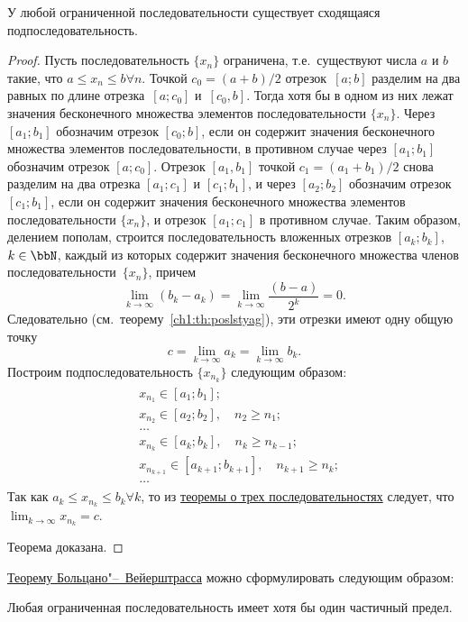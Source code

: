 \begin{thm}\label{ch1:th:TBV}
 У любой ограниченной последовательности существует сходящаяся подпоследовательность.
\end{thm}
\begin{proof}
Пусть последовательность $\{x_n\}$ ограничена, т.е.~существуют числа $a$ и $b$ такие, что $a \le x_n \le b$\quad$\forall n$. Точкой
$c_0 = (a + b)/2$ отрезок~$[a; b]$ разделим на два равных по длине отрезка~$[a; c_0]$ и~$[c_0,b]$. Тогда хотя бы в одном из них лежат значения бесконечного множества элементов последовательности $\{x_n\}$. Через $[a_1;b_1]$ обозначим отрезок $[c_0;b]$, если он содержит значения бесконечного множества элементов последовательности, в противном случае через $[a_1; b_1]$ обозначим отрезок $[a; c_0]$. Отрезок $[a_1, b_1]$ точкой $c_1 = (a_1 + b_1)/2$ снова разделим на два отрезка $[a_1;c_1]$ и $[c_1;b_1]$, и через $[a_2;b_2]$ обозначим отрезок $[c_1;b_1]$, если он содержит значения бесконечного множества элементов последовательности $\{x_n\}$, и отрезок $[a_1; c_1]$ в противном случае. Таким образом, делением пополам, строится последовательность вложенных отрезков $[a_k;b_k]$, $k \in \bbN$, каждый из которых содержит значения бесконечного множества членов последовательности~$\{x_n\}$, причем
$$
\lim_{k\to \infty}(b_k-a_k)=\lim_{k \to \infty}\frac{(b-a)}{2^k}=0.
$$
Следовательно (см.~теорему~\ref{ch1:th:poslstyag}), эти отрезки имеют одну общую точку
$$
c = \lim_{k \to \infty} a_k = \lim_{k \to \infty} b_k.
$$
Построим подпоследовательность $\{x_{n_k}\}$ следующим образом:
\begin{gather*}
\begin{aligned}
& x_{n_1} \in [a_1;b_1];\\
& x_{n_2} \in [a_2;b_2],\quad n_2 \ge n_1;\\
& \ldots\\
& x_{n_k} \in [a_k;b_k],\quad n_k \ge n_{k-1};\\
& x_{n_{k+1}} \in [a_{k+1};b_{k+1}],\quad n_{k+1} \ge n_k;\\
& \ldots
\end{aligned}
\end{gather*}
Так как $a_k \le x_{n_k} \le b_k$\quad$\forall k$, то из \hyperref[ch1:th:otrehposled]{теоремы о трех последовательностях} следует, что $\lim_{k \to \infty}\limits x_{n_k} = c$.

Теорема доказана.
\end{proof}

\hyperref[ch1:th:TBV]{Теорему Больцано"--~Вейерштрасса} можно сформулировать следующим образом: 
\begin{thmn} Любая ограниченная последовательность имеет хотя бы один частичный предел.
\end{thmn}

